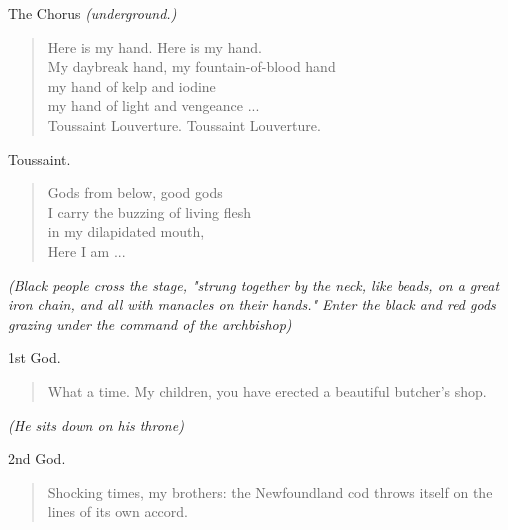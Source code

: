 \documentclass[letterpaper,article,12pt,oneside,notitlepage]{memoir}
\begin{document}
\begin{center}The Chorus \textit{(underground.)}\end{center}

\begin{verse}
\hspace{1cm} Here is my hand. Here is my hand. \\
My daybreak hand, my fountain-of-blood hand \\
my hand of kelp and iodine \\
my hand of light and vengeance ... \\
Toussaint Louverture. Toussaint Louverture. \\
\end{verse}

\clearpage

\begin{center}Toussaint.\end{center}

\begin{verse}
Gods from below, good gods \\
I carry the buzzing of living flesh \\
in my dilapidated mouth, \\
Here I am ... \\
\end{verse}

\textit{(Black people cross the stage, "strung together by the neck, like beads, on a great iron chain, and all with manacles on their hands." Enter the black and red gods grazing under the command of the archbishop)}

\begin{center}1st God.\end{center}

\begin{verse}
What a time. My children, you have erected a beautiful butcher's shop. \\
\end{verse}

\textit{(He sits down on his throne)}

\begin{center}2nd God.\end{center}

\begin{verse}
Shocking times, my brothers: the Newfoundland cod throws itself on the lines of its own accord. \\
\end{verse}
\end{document}
